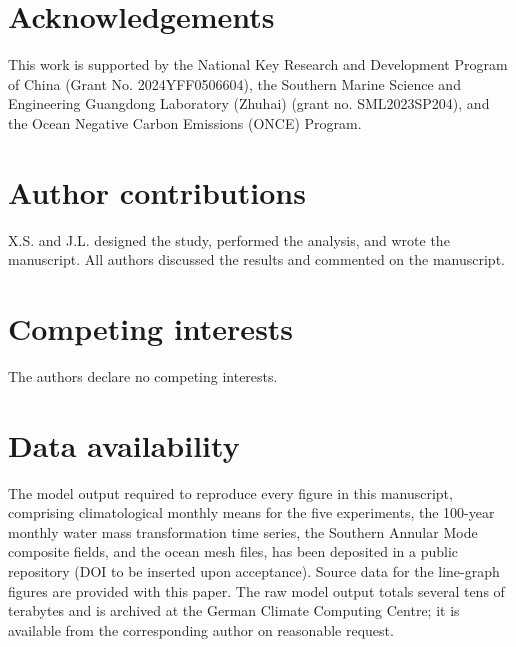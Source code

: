 \documentclass[pdflatex,sn-nature]{sn-jnl}
\begin{document}

\backmatter

\section*{Acknowledgements}
This work is supported by the National Key Research and Development Program of China (Grant No. 2024YFF0506604), the Southern Marine Science and Engineering Guangdong Laboratory (Zhuhai) (grant no. SML2023SP204), and the Ocean Negative Carbon Emissions (ONCE) Program.

\section*{Author contributions}
X.S. and J.L. designed the study, performed the analysis, and wrote the manuscript. All authors discussed the results and commented on the manuscript.

\section*{Competing interests}
The authors declare no competing interests.

\section*{Data availability}
The model output required to reproduce every figure in this manuscript, comprising climatological monthly means for the five experiments, the 100-year monthly water mass transformation time series, the Southern Annular Mode composite fields, and the ocean mesh files, has been deposited in a public repository (DOI to be inserted upon acceptance). Source data for the line-graph figures are provided with this paper. The raw model output totals several tens of terabytes and is archived at the German Climate Computing Centre; it is available from the corresponding author on reasonable request.
\end{document}
